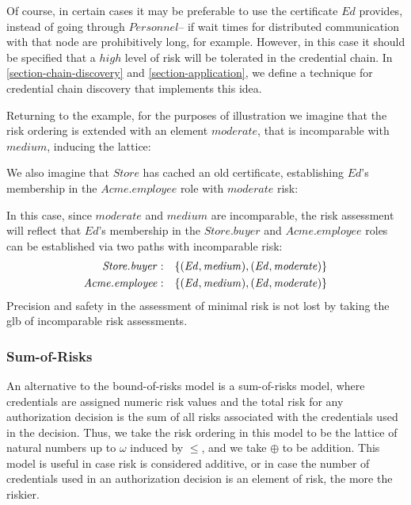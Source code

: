 Of course, in certain cases it may be preferable to use the
certificate $\mathit{Ed}$ provides, instead of going through
$\mathit{Personnel}$-- if wait times for distributed communication
with that node are prohibitively long, for example.  However, in this
case it should be specified that a $\mathit{high}$ level of risk will
be tolerated in the credential chain.  In
\autoref{section-chain-discovery} and \autoref{section-application},
we define a technique for credential chain discovery that implements
this idea.

Returning to the example, for the purposes of illustration we imagine
that the risk ordering is extended with an element $\mathit{moderate}$,
that is incomparable with $\mathit{medium}$, inducing the lattice:
\begin{center}
\risklattice
\end{center}
We also imagine that $\mathit{Store}$ has cached an old certificate,
establishing $\mathit{Ed}$'s membership in the $\mathit{Acme.employee}$
role with $\mathit{moderate}$ risk:
\begin{mathpar}
\end{mathpar}
In this case, since $\mathit{moderate}$ and $\mathit{medium}$ are 
incomparable, the risk assessment will reflect that $\mathit{Ed}$'s
membership in the $\mathit{Store.buyer}$ and $\mathit{Acme.employee}$
roles can be established via two paths with incomparable risk:
\begin{eqnarray*}
\mathit{Store.buyer}&:& \setdefn{(\mathit{Ed, medium}),(\mathit{Ed, moderate})}\\
\mathit{Acme.employee}&:& \setdefn{(\mathit{Ed, medium}),(\mathit{Ed, moderate})}
\end{eqnarray*}
Precision and safety in the assessment of minimal risk is not lost by
taking the glb of incomparable risk assessments.

\subsubsection{Sum-of-Risks}
\label{sec:sum-of-risks}

An alternative to the bound-of-risks model is a sum-of-risks model,
where credentials are assigned numeric risk values and the total risk
for any authorization decision is the sum of all risks associated with
the credentials used in the decision.  Thus, we take the risk ordering
in this model to be the lattice of natural numbers up to $\omega$
induced by $\leq$, and we take $\oplus$ to be addition.  This model is
useful in case risk is considered additive, or in case the number of
credentials used in an authorization decision is an element of risk,
the more the riskier.

